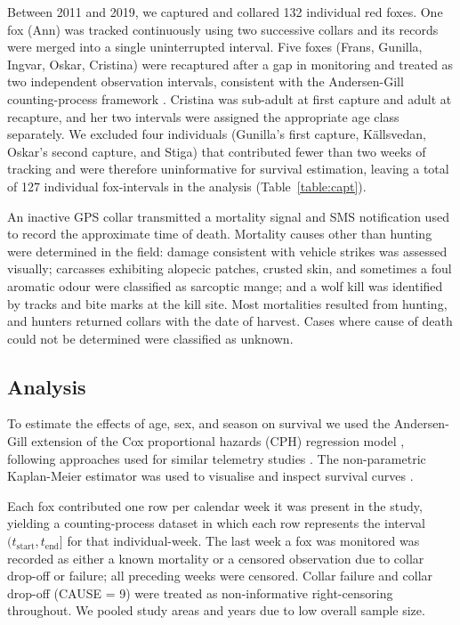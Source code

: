 \documentclass[12pt,a4paper,final,abstract=true,headings=small]{scrartcl}
\begin{document}
Between 2011 and 2019, we captured and collared 132 individual red foxes. One fox (Ann) was tracked continuously using two successive collars and its records were merged into a single uninterrupted interval. Five foxes (Frans, Gunilla, Ingvar, Oskar, Cristina) were recaptured after a gap in monitoring and treated as two independent observation intervals, consistent with the Andersen-Gill counting-process framework \citep{andersenCoxsRegressionModel1982}. Cristina was sub-adult at first capture and adult at recapture, and her two intervals were assigned the appropriate age class separately. We excluded four individuals (Gunilla's first capture, Källsvedan, Oskar's second capture, and Stiga) that contributed fewer than two weeks of tracking and were therefore uninformative for survival estimation, leaving a total of 127 individual fox-intervals in the analysis (Table~\ref{table:capt}).

An inactive GPS collar transmitted a mortality signal and SMS notification used to record the approximate time of death. Mortality causes other than hunting were determined in the field: damage consistent with vehicle strikes was assessed visually; carcasses exhibiting alopecic patches, crusted skin, and sometimes a foul aromatic odour were classified as sarcoptic mange; and a wolf kill was identified by tracks and bite marks at the kill site. Most mortalities resulted from hunting, and hunters returned collars with the date of harvest. Cases where cause of death could not be determined were classified as unknown.



\subsection*{Analysis}
To estimate the effects of age, sex, and season on survival we used the Andersen-Gill extension of the Cox proportional hazards (CPH) regression model \citep{andersenCoxsRegressionModel1982}, following approaches used for similar telemetry studies \citep{johnsonModelingSurvivalApplication2004,   ahlenSurvivalFemaleCapercaillie2013}. The non-parametric Kaplan-Meier estimator was used to visualise and inspect survival curves
\citep{pollockSurvivalAnalysisTelemetry1989}.

Each fox contributed one row per calendar week it was present in the study, yielding a counting-process dataset in which each row represents the interval $(t_{\text{start}}, t_{\text{end}}]$ for that individual-week. The last week a fox was monitored was recorded as either a known mortality or a censored observation due to collar drop-off or failure; all preceding weeks were censored. Collar failure and collar drop-off (CAUSE = 9) were treated as non-informative right-censoring throughout. We pooled study areas and years due to low overall sample size.
\end{document}
